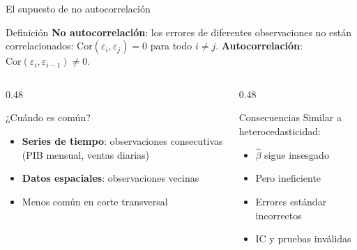 \documentclass[aspectratio=169, 11pt]{beamer}
\begin{document}
\begin{frame}{El supuesto de no autocorrelación}
\begin{block}{Definición}
\textbf{No autocorrelación}: los errores de diferentes observaciones no están correlacionados:
$\text{Cor}(\varepsilon_i, \varepsilon_j) = 0$ para todo $i \neq j$.
\textbf{Autocorrelación}: $\text{Cor}(\varepsilon_i, \varepsilon_{i-1}) \neq 0$.
\end{block}

\vspace{0.1cm}
\begin{columns}
\begin{column}{0.48\textwidth}
\begin{exampleblock}{¿Cuándo es común?}
\begin{itemize}
\item \textbf{Series de tiempo}: observaciones consecutivas (PIB mensual, ventas diarias)
\item \textbf{Datos espaciales}: observaciones vecinas
\item Menos común en corte transversal
\end{itemize}
\end{exampleblock}
\end{column}

\begin{column}{0.48\textwidth}
\begin{alertblock}{Consecuencias}
Similar a heterocedasticidad:
\begin{itemize}
\item $\hat{\beta}$ sigue insesgado
\item Pero ineficiente
\item Errores estándar incorrectos
\item IC y pruebas inválidas
\end{itemize}
\end{alertblock}
\end{column}
\end{columns}
\end{frame}
\end{document}
